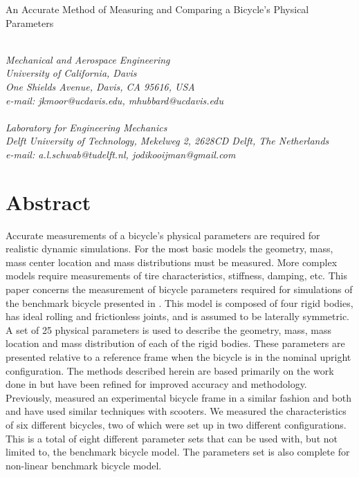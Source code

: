 \documentclass{bmd2010a}
\begin{document}
\begin{flushleft}
{\fontsize{16pt}{20pt}\selectfont%
  An Accurate Method of Measuring and Comparing a Bicycle's Physical Parameters\\}
\end{flushleft}

\begin{flushleft}
  {\\}
  \textit{Mechanical and Aerospace Engineering\\
          University of California, Davis\\
          One Shields Avenue, Davis, CA 95616, USA\\
          e-mail: jkmoor@ucdavis.edu, mhubbard@ucdavis.edu
  }\vspace{10pt}\\
  {\\}
  \textit{Laboratory for Engineering Mechanics\\
          Delft University of Technology, Mekelweg 2, 2628CD Delft, The
          Netherlands\\
          e-mail: a.l.schwab@tudelft.nl, jodikooijman@gmail.com
  }\vspace{10pt}\\
\end{flushleft}

\section*{Abstract}
Accurate measurements of a bicycle's physical parameters are required for
realistic dynamic simulations. For the most basic models the geometry, mass,
mass center location and mass distributions must be measured. More complex models
require measurements of tire characteristics, stiffness, damping, etc. This
paper concerns the measurement of bicycle parameters required for
simulations of the benchmark bicycle presented in \cite{Meijaard2007}. This
model is composed of four rigid bodies, has ideal rolling and frictionless joints,
and is assumed to be laterally symmetric. A set of 25
physical parameters is used to describe the geometry, mass, mass location and
mass distribution of each of the rigid bodies. These parameters are presented
relative to a reference frame when the bicycle is in the nominal upright
configuration. The methods described herein are based primarily on the work
done in \cite{Kooijman2006} but have been refined for improved accuracy and
methodology. Previously, \cite{Roland1971} measured an experimental bicycle frame in a
similar fashion and both \cite{Dohring1953} and \cite{Singh1971} have used
similar techniques with scooters. We measured the characteristics of six
different bicycles, two of which were set up in two different configurations.
This is a total of eight different parameter sets that can be used with, but not
limited to, the benchmark bicycle model. The parameters set is also complete
for non-linear benchmark bicycle model.
\end{document}
